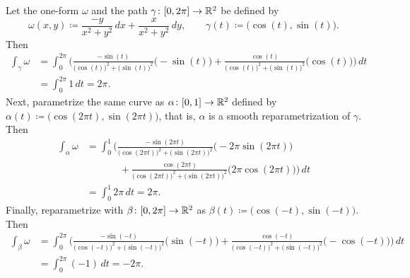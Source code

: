 \begin{example} \label{example:mv:irrotoneformint}
Let the one-form $\omega$ and the path $\gamma \colon [0,2\pi] \to {\mathbb{R}}^2$ be defined by
\begin{equation*}
\omega(x,y) \coloneqq \frac{-y}{x^2+y^2} \,dx + \frac{x}{x^2+y^2} \,dy,
\qquad
\gamma(t) \coloneqq \bigl(\cos(t),\sin(t)\bigr) .
\end{equation*}
Then
\begin{equation*}
\begin{split}
\int_{\gamma} \omega
& =
\int_0^{2\pi}
\Biggl(
\frac{-\sin(t)}{{\bigl(\cos(t)\bigr)}^2+{\bigl(\sin(t)\bigr)}^2}
\bigl(-\sin(t)\bigr)
+
\frac{\cos(t)}{{\bigl(\cos(t)\bigr)}^2+{\bigl(\sin(t)\bigr)}^2}
\bigl(\cos(t)\bigr)
\Biggr) \, dt
\\
& =
\int_0^{2\pi}
1 \, dt
= 2\pi .
\end{split}
\end{equation*}
Next, parametrize the same curve as
$\alpha \colon [0,1] \to {\mathbb{R}}^2$ defined by $\alpha(t) \coloneqq \bigl(\cos(2\pi
t),\sin(2 \pi t)\bigr)$, that is,
$\alpha$ is a smooth reparametrization of $\gamma$.
Then
\begin{equation*}
\begin{split}
\int_{\alpha} \omega
& =
\int_0^{1}
\Biggl(
\frac{-\sin(2\pi t)}{{\bigl(\cos(2\pi t)\bigr)}^2+{\bigl(\sin(2\pi t)\bigr)}^2}
\bigl(-2\pi \sin(2\pi t)\bigr)
\\
& \phantom{=\int_0^1\Biggl(~}
+
\frac{\cos(2 \pi t)}{{\bigl(\cos(2 \pi t)\bigr)}^2+{\bigl(\sin(2 \pi t)\bigr)}^2}
\bigl(2 \pi \cos(2 \pi t)\bigr)
\Biggr) \, dt
\\
& =
\int_0^{1}
2\pi \, dt
= 2\pi .
\end{split}
\end{equation*}
Finally, reparametrize with $\beta \colon [0,2\pi] \to {\mathbb{R}}^2$
as $\beta(t) \coloneqq \bigl(\cos(-t),\sin(-t)\bigr)$.  Then
\begin{equation*}
\begin{split}
\int_{\beta} \omega
& =
\int_0^{2\pi}
\Biggl(
\frac{-\sin(-t)}{{\bigl(\cos(-t)\bigr)}^2+{\bigl(\sin(-t)\bigr)}^2}
\bigl(\sin(-t)\bigr)
+
\frac{\cos(-t)}{{\bigl(\cos(-t)\bigr)}^2+{\bigl(\sin(-t)\bigr)}^2}
\bigl(-\cos(-t)\bigr)
\Biggr) \, dt
\\
& =
\int_0^{2\pi}
(-1) \, dt
= -2\pi .
\end{split}

\end{equation*}
\end{example}
